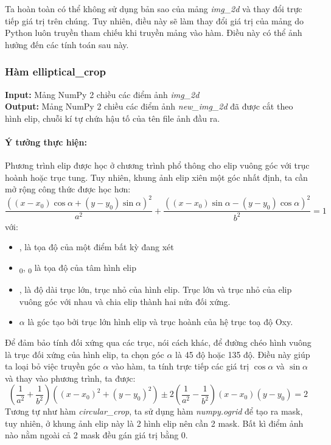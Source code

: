 \documentclass[]{article}
\begin{document}
Ta hoàn toàn có thể không sử dụng bản sao của mảng \textit{img\_2d} và thay đổi trực tiếp giá trị trên chúng. Tuy nhiên, điều này sẽ làm thay đổi giá trị của mảng do Python luôn truyền tham chiếu khi truyền mảng vào hàm. Điều này có thể ảnh hưởng đến các tính toán sau này.

\subsubsection{Hàm elliptical\_crop}
\textbf{Input:} Mảng NumPy 2 chiều các điểm ảnh \textit{img\_2d} \\
\textbf{Output:} Mảng NumPy 2 chiều các điểm ảnh \textit{new\_img\_2d} đã được cắt theo hình elip, chuỗi kí tự chứa hậu tố của tên file ảnh đầu ra.
\paragraph{Ý tưởng thực hiện:} Phương trình elip được học ở chương trình phổ thông cho elip vuông góc với trục hoành hoặc trục tung. Tuy nhiên, khung ảnh elip xiên một góc nhất định, ta cần mở rộng công thức được học hơn:
\[ \frac{((x-x_0)\cos \alpha + (y-y_0) \sin \alpha)^2}{a^2} + \frac{((x-x_0)\sin \alpha - (y-y_0) \cos \alpha)^2}{b^2}= 1 \]
với:
\begin{itemize}
  \item {},  là tọa độ của một điểm bất kỳ đang xét
  \item {}\textsubscript 0, \textsubscript 0 là tọa độ của tâm hình elip
  \item {},  là độ dài trục lớn, trục nhỏ của hình elip. Trục lớn và trục nhỏ của elip vuông góc với nhau và chia elip thành hai nửa đối xứng.
  \item $\alpha$ là góc tạo bởi trục lớn hình elip và trục hoành của hệ trục toạ độ Oxy.
\end{itemize}
Để đảm bảo tính đối xứng qua các trục, nói cách khác, để đường chéo hình vuông là trục đối xứng của hình elip, ta chọn góc $\alpha$ là 45 độ hoặc 135 độ. Điều này giúp ta loại bỏ việc truyền góc $\alpha$ vào hàm, ta tính trực tiếp các giá trị $\cos \alpha$ và $\sin \alpha$ và thay vào phương trình, ta được:
\begin{equation}
  (\frac{1}{a^2} + \frac{1}{b^2})((x-x_0)^2 + (y-y_0)^2) \pm 2(\frac{1}{a^2} - \frac{1}{b^2})(x-x_0) (y-y_0) = 2
  \label{eq:elip}
\end{equation}
Tương tự như hàm \textit{circular\_crop}, ta sử dụng hàm \textit{numpy.ogrid} để tạo ra mask, tuy nhiên, ở khung ảnh elip này là 2 hình elip nên cần 2 mask. Bất kì điểm ảnh nào nằm ngoài cả 2 mask đều gán giá trị bằng 0.\\
\end{document}
